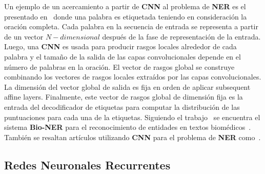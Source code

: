 Un ejemplo de un acercamiento a partir de \textbf{CNN} al problema de \textbf{NER} es el presentado en~\cite{collobert2011natural} donde una palabra es etiquetada teniendo en consideraci\'on la oraci\'on completa. Cada palabra en la secuencia de entrada se representa a partir de un vector $N-dimensional$ despu\'es de la fase de representaci\'on de la entrada. Luego, una \textbf{CNN} es usada para producir rasgos locales alrededor de cada palabra y el tama\~no de la salida de las capas convolucionales depende en el n\'umero de palabras en la oraci\'on. El vector de rasgos global se construye combinando los vectores de rasgos locales extra\'idos por las capas convolucionales. La dimensi\'on del vector global de salida es fija en orden de aplicar subsequent affine layers. Finalmente, este vector de rasgos global de dimensi\'on fija es la entrada del decodificador de etiquetas para computar la distribuci\'on de las puntuaciones para cada una de la etiquetas. Siguiendo el trabajo~\cite{collobert2011natural} se encuentra el sistema \textbf{Bio-NER} para el reconocimiento de entidades en textos biom\'edicos~\cite{yao2015biomedical}. Tambi\'en se resaltan art\'iculos utilizando \textbf{CNN} para el problema de \textbf{NER} como~\cite{zhou2017joint}.

\subsection{Redes Neuronales Recurrentes}



